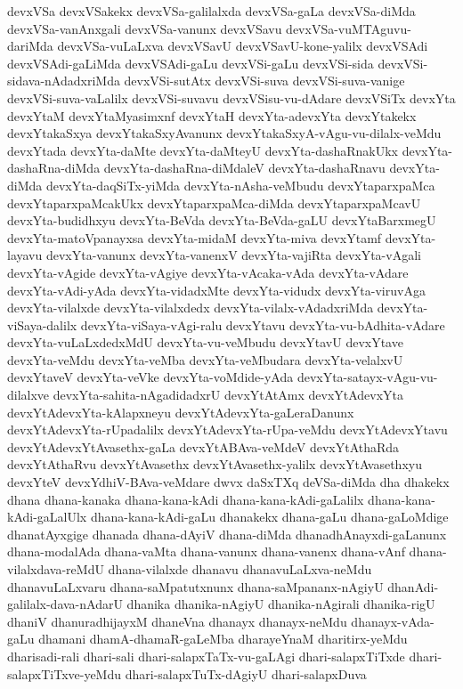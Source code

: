 {devxVSa
devxVSakekx
devxVSa-galilalxda
devxVSa-gaLa
devxVSa-diMda
devxVSa-vanAnxgali
devxVSa-vanunx
devxVSavu
devxVSa-vuMTAguvu-dariMda
devxVSa-vuLaLxva
devxVSavU
devxVSavU-kone-yalilx
devxVSAdi
devxVSAdi-gaLiMda
devxVSAdi-gaLu
devxVSi-gaLu
devxVSi-sida
devxVSi-sidava-nAdadxriMda
devxVSi-sutAtx
devxVSi-suva
devxVSi-suva-vanige
devxVSi-suva-vaLalilx
devxVSi-suvavu
devxVSisu-vu-dAdare
devxVSiTx
devxYta
devxYtaM
devxYtaMyasimxnf
devxYtaH
devxYta-adevxYta
devxYtakekx
devxYtakaSxya
devxYtakaSxyAvanunx
devxYtakaSxyA-vAgu-vu-dilalx-veMdu
devxYtada
devxYta-daMte
devxYta-daMteyU
devxYta-dashaRnakUkx
devxYta-dashaRna-diMda
devxYta-dashaRna-diMdaleV
devxYta-dashaRnavu
devxYta-diMda
devxYta-daqSiTx-yiMda
devxYta-nAsha-veMbudu
devxYtaparxpaMca
devxYtaparxpaMcakUkx
devxYtaparxpaMca-diMda
devxYtaparxpaMcavU
devxYta-budidhxyu
devxYta-BeVda
devxYta-BeVda-gaLU
devxYtaBarxmegU
devxYta-matoVpanayxsa
devxYta-midaM
devxYta-miva
devxYtamf
devxYta-layavu
devxYta-vanunx
devxYta-vanenxV
devxYta-vajiRta
devxYta-vAgali
devxYta-vAgide
devxYta-vAgiye
devxYta-vAcaka-vAda
devxYta-vAdare
devxYta-vAdi-yAda
devxYta-vidadxMte
devxYta-vidudx
devxYta-viruvAga
devxYta-vilalxde
devxYta-vilalxdedx
devxYta-vilalx-vAdadxriMda
devxYta-viSaya-dalilx
devxYta-viSaya-vAgi-ralu
devxYtavu
devxYta-vu-bAdhita-vAdare
devxYta-vuLaLxdedxMdU
devxYta-vu-veMbudu
devxYtavU
devxYtave
devxYta-veMdu
devxYta-veMba
devxYta-veMbudara
devxYta-velalxvU
devxYtaveV
devxYta-veVke
devxYta-voMdide-yAda
devxYta-satayx-vAgu-vu-dilalxve
devxYta-sahita-nAgadidadxrU
devxYtAtAmx
devxYtAdevxYta
devxYtAdevxYta-kAlapxneyu
devxYtAdevxYta-gaLeraDanunx
devxYtAdevxYta-rUpadalilx
devxYtAdevxYta-rUpa-veMdu
devxYtAdevxYtavu
devxYtAdevxYtAvasethx-gaLa
devxYtABAva-veMdeV
devxYtAthaRda
devxYtAthaRvu
devxYtAvasethx
devxYtAvasethx-yalilx
devxYtAvasethxyu
devxYteV
devxYdhiV-BAva-veMdare
dwvx
daSxTXq
deVSa-diMda
dha
dhakekx
dhana
dhana-kanaka
dhana-kana-kAdi
dhana-kana-kAdi-gaLalilx
dhana-kana-kAdi-gaLalUlx
dhana-kana-kAdi-gaLu
dhanakekx
dhana-gaLu
dhana-gaLoMdige
dhanatAyxgige
dhanada
dhana-dAyiV
dhana-diMda
dhanadhAnayxdi-gaLanunx
dhana-modalAda
dhana-vaMta
dhana-vanunx
dhana-vanenx
dhana-vAnf
dhana-vilalxdava-reMdU
dhana-vilalxde
dhanavu
dhanavuLaLxva-neMdu
dhanavuLaLxvaru
dhana-saMpatutxnunx
dhana-saMpananx-nAgiyU
dhanAdi-galilalx-dava-nAdarU
dhanika
dhanika-nAgiyU
dhanika-nAgirali
dhanika-rigU
dhaniV
dhanuradhijayxM
dhaneVna
dhanayx
dhanayx-neMdu
dhanayx-vAda-gaLu
dhamani
dhamA-dhamaR-gaLeMba
dharayeYnaM
dharitirx-yeMdu
dharisadi-rali
dhari-sali
dhari-salapxTaTx-vu-gaLAgi
dhari-salapxTiTxde
dhari-salapxTiTxve-yeMdu
dhari-salapxTuTx-dAgiyU
dhari-salapxDuva
}

